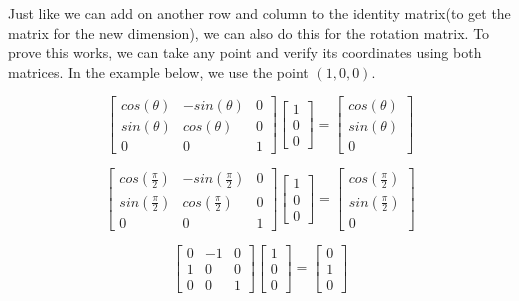 \documentclass[14pt]{article}
\begin{document}
Just like we can add on another row and column to the identity matrix(to get the matrix for the new dimension), we can also do this for the rotation matrix. To prove this works, we can take any point and verify its coordinates using both matrices. In the example below, we use the point $(1, 0, 0)$.

\vspace*{1em}

\begin{equation}
	\begin{bmatrix}
	cos(\theta) & -sin(\theta) & 0 \\
	sin(\theta) & cos(\theta) & 0 \\ 
	0 & 0 & 1
	\end{bmatrix}
	\begin{bmatrix}
	1 \\
	0 \\ 
	0
	\end{bmatrix}	
	=
	\begin{bmatrix}
	cos(\theta) \\
	sin(\theta) \\ 
	0
	\end{bmatrix}
\end{equation}

\vspace*{1em}

\begin{equation}
	\begin{bmatrix}
	cos(\frac{\pi}{2}) & -sin(\frac{\pi}{2}) & 0 \\
	sin(\frac{\pi}{2}) & cos(\frac{\pi}{2}) & 0 \\ 
	0 & 0 & 1
	\end{bmatrix}
	\begin{bmatrix}
	1 \\
	0 \\ 
	0
	\end{bmatrix}	
	=
	\begin{bmatrix}
	cos(\frac{\pi}{2}) \\
	sin(\frac{\pi}{2}) \\ 
	0
	\end{bmatrix}
\end{equation}

\vspace*{1em}

\begin{equation}
	\begin{bmatrix}
	0 & -1 & 0 \\
	1 & 0 & 0 \\ 
	0 & 0 & 1
	\end{bmatrix}
	\begin{bmatrix}
	1 \\
	0 \\ 
	0
	\end{bmatrix}	
	=
	\begin{bmatrix}
	0 \\
	1 \\ 
	0
	\end{bmatrix}
\end{equation}
\end{document}
